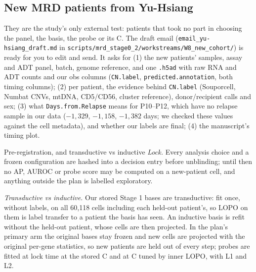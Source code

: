 \subsection{New MRD patients from Yu-Hsiang}

They are the study's only external test: patients that took no part in choosing the panel, the basis, the probe or its C. The draft email (\texttt{email\_yu-hsiang\_draft.md} in \texttt{scripts/\allowbreak mrd\_stage0\_2/\allowbreak workstreams/\allowbreak W8\_new\_cohort/}) is ready for you to edit and send. It asks for (1) the new patients' samples, assay and ADT panel, batch, genome reference, and one \texttt{.h5ad} with raw RNA and ADT counts and our obs columns (\texttt{CN.label}, \texttt{predicted.annotation}, both timing columns); (2) per patient, the evidence behind \texttt{CN.label} (Souporcell, Numbat CNVs, mtDNA, CD5/CD56, cluster reference), donor/recipient calls and sex; (3) what \texttt{Days.from.Relapse} means for P10--P12, which have no relapse sample in our data ($-1{,}329$, $-1{,}158$, $-1{,}382$ days; we checked these values against the cell metadata), and whether our labels are final; (4) the manuscript's timing plot.

\begin{explainbox}{Pre-registration, and transductive vs inductive}
\emph{Lock.} Every analysis choice and a frozen configuration are hashed into a decision entry before unblinding; until then no AP, AUROC or probe score may be computed on a new-patient cell, and anything outside the plan is labelled exploratory.

\emph{Transductive vs inductive.} Our stored Stage 1 bases are transductive: fit once, without labels, on all 60,118 cells including each held-out patient's, so LOPO on them is label transfer to a patient the basis has seen. An inductive basis is refit without the held-out patient, whose cells are then projected. In the plan's primary arm the original bases stay frozen and new cells are projected with the original per-gene statistics, so new patients are held out of every step; probes are fitted at lock time at the stored C and at C tuned by inner LOPO, with L1 and L2.
\end{explainbox}

